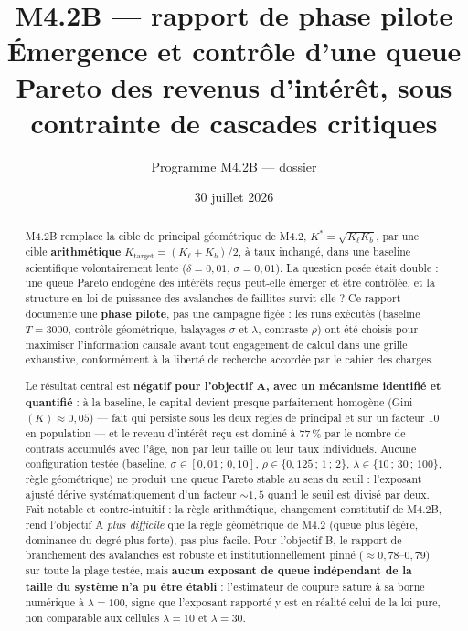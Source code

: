 \documentclass[11pt,a4paper]{article}
\title{M4.2B --- rapport de phase pilote\\
\large Émergence et contrôle d'une queue Pareto des revenus d'intérêt,
sous contrainte de cascades critiques}
\author{Programme M4.2B --- dossier \code{m4\_2b\_credit\_soc}}
\date{30 juillet 2026}
\begin{document}
\maketitle

\begin{abstract}
M4.2B remplace la cible de principal géométrique de M4.2,
$K^*=\sqrt{K_\ell K_b}$, par une cible \textbf{arithmétique}
$K_{\mathrm{target}}=(K_\ell+K_b)/2$, à taux inchangé, dans une baseline
scientifique volontairement lente ($\delta=0{,}01$, $\sigma=0{,}01$). La
question posée était double : une queue Pareto endogène des intérêts reçus
peut-elle émerger et être contrôlée, et la structure en loi de puissance
des avalanches de faillites survit-elle ? Ce rapport documente une
\textbf{phase pilote}, pas une campagne figée : les runs exécutés (baseline
$T=3000$, contrôle géométrique, balayages $\sigma$ et $\lambda$,
contraste $\rho$) ont été choisis pour maximiser l'information causale
avant tout engagement de calcul dans une grille exhaustive, conformément
à la liberté de recherche accordée par le cahier des charges.

Le résultat central est \textbf{négatif pour l'objectif A, avec un
mécanisme identifié et quantifié} : à la baseline, le capital devient
presque parfaitement homogène (Gini$(K)\approx0{,}05$) --- fait qui
persiste sous les deux règles de principal et sur un facteur 10 en
population --- et le revenu d'intérêt reçu est dominé à 77\,\% par le
nombre de contrats accumulés avec l'âge, non par leur taille ou leur taux
individuels. Aucune configuration testée (baseline, $\sigma\in[0{,}01\,;\,
0{,}10]$, $\rho\in\{0{,}125\,;\,1\,;\,2\}$, $\lambda\in\{10\,;\,30\,;\,100\}$,
règle géométrique) ne produit une queue Pareto stable au sens du seuil :
l'exposant ajusté dérive systématiquement d'un facteur $\sim\!1{,}5$ quand
le seuil est divisé par deux. Fait notable et contre-intuitif : la règle
arithmétique, changement constitutif de M4.2B, rend l'objectif A
\emph{plus difficile} que la règle géométrique de M4.2 (queue plus légère,
dominance du degré plus forte), pas plus facile. Pour l'objectif B, le
rapport de branchement des avalanches est robuste et institutionnellement
pinné ($\approx0{,}78$--$0{,}79$) sur toute la plage testée, mais
\textbf{aucun exposant de queue indépendant de la taille du système n'a pu
être établi} : l'estimateur de coupure sature à sa borne numérique à
$\lambda=100$, signe que l'exposant rapporté y est en réalité celui de la
loi pure, non comparable aux cellules $\lambda=10$ et $\lambda=30$.
\end{abstract}
\end{document}

